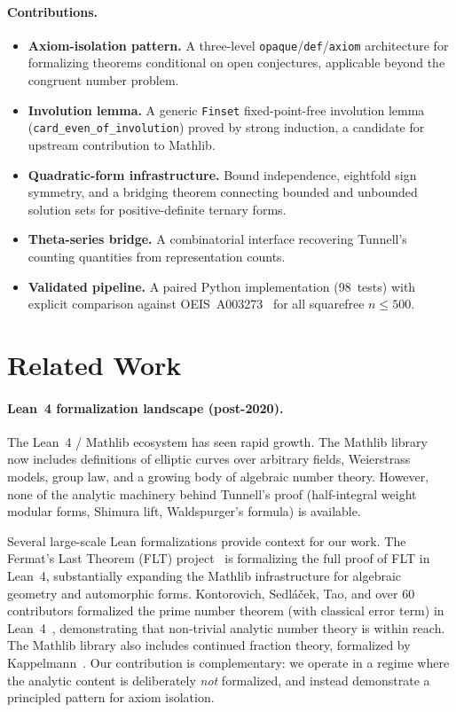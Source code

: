 \documentclass[11pt,a4paper]{article}
\theoremstyle{definition}
\newcommand{\lean}[1]{\texttt{#1}}
\begin{document}
\paragraph{Contributions.}
\begin{itemize}[nosep]
  \item \textbf{Axiom-isolation pattern.}  A three-level
    \lean{opaque}/\lean{def}/\lean{axiom} architecture for
    formalizing theorems conditional on open conjectures, applicable
    beyond the congruent number problem.
  \item \textbf{Involution lemma.}  A generic \lean{Finset}
    fixed-point-free involution lemma
    (\lean{card\_even\_of\_involution}) proved by strong induction,
    a candidate for upstream contribution to Mathlib.
  \item \textbf{Quadratic-form infrastructure.}  Bound independence,
    eightfold sign symmetry, and a bridging theorem connecting
    bounded and unbounded solution sets for positive-definite
    ternary forms.
  \item \textbf{Theta-series bridge.}  A combinatorial interface
    recovering Tunnell's counting quantities from representation
    counts.
  \item \textbf{Validated pipeline.}  A paired Python implementation
    (98~tests) with explicit comparison against
    OEIS~A003273~\cite{OEIS_A003273} for all squarefree $n \le 500$.
\end{itemize}

\section{Related Work}\label{sec:related}

\paragraph{Lean~4 formalization landscape (post-2020).}
The Lean~4 / Mathlib ecosystem has seen rapid growth.
The Mathlib library~\cite{Mathlib2024} now includes definitions
of elliptic curves over arbitrary fields, Weierstrass models,
group law, and a growing body of algebraic number theory.
However, none of the analytic machinery behind Tunnell's proof
(half-integral weight modular forms, Shimura lift, Waldspurger's
formula) is available.

Several large-scale Lean formalizations provide context for our work.
The Fermat's Last Theorem (FLT) project~\cite{FLT2024} is formalizing
the full proof of FLT in Lean~4, substantially expanding the
Mathlib infrastructure for algebraic geometry and automorphic forms.
Kontorovich, Sedl\'{a}\v{c}ek, Tao, and over 60 contributors
formalized the prime number theorem (with classical error term)
in Lean~4~\cite{PNTLean2024}, demonstrating that non-trivial
analytic number theory is within reach.
The Mathlib library also includes continued fraction theory,
formalized by Kappelmann~\cite{Kappelmann2024}.
Our contribution is complementary: we operate in a regime where
the analytic content is deliberately \emph{not} formalized, and
instead demonstrate a principled pattern for axiom isolation.
\end{document}
